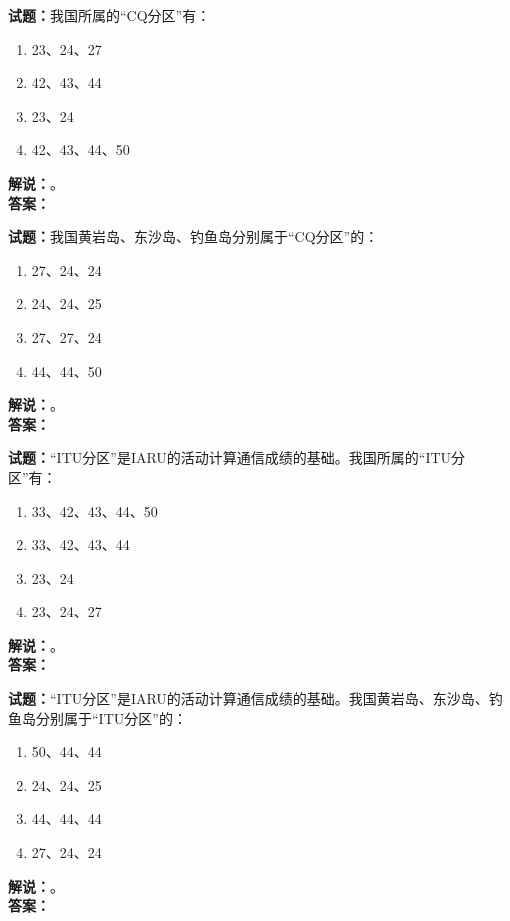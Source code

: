 \documentclass{ctexbook}
\begin{document}
\bigskip




\noindent\textbf{试题：}我国所属的“CQ分区”有：
\begin{enumerate}[leftmargin=3em]
\item 23、24、27
\item 42、43、44
\item 23、24
\item 42、43、44、50
\end{enumerate}
\noindent\textbf{解说：}\textbf{}。\\\noindent\textbf{答案：}

\bigskip




\noindent\textbf{试题：}我国黄岩岛、东沙岛、钓鱼岛分别属于“CQ分区”的：
\begin{enumerate}[leftmargin=3em]
\item 27、24、24
\item 24、24、25
\item 27、27、24
\item 44、44、50
\end{enumerate}
\noindent\textbf{解说：}\textbf{}。\\\noindent\textbf{答案：}

\bigskip




\noindent\textbf{试题：}“ITU分区”是IARU的活动计算通信成绩的基础。我国所属的“ITU分区”有：
\begin{enumerate}[leftmargin=3em]
\item 33、42、43、44、50
\item 33、42、43、44
\item 23、24
\item 23、24、27
\end{enumerate}
\noindent\textbf{解说：}\textbf{}。\\\noindent\textbf{答案：}

\bigskip




\noindent\textbf{试题：}“ITU分区”是IARU的活动计算通信成绩的基础。我国黄岩岛、东沙岛、钓鱼岛分别属于“ITU分区”的：
\begin{enumerate}[leftmargin=3em]
\item 50、44、44
\item 24、24、25
\item 44、44、44
\item 27、24、24
\end{enumerate}
\noindent\textbf{解说：}\textbf{}。\\\noindent\textbf{答案：}
\end{document}

